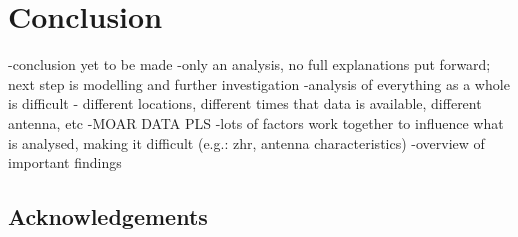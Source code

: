 \chapter{Conclusion}
-conclusion yet to be made
-only an analysis, no full explanations put forward; next step is modelling and further investigation
-analysis of everything as a whole is difficult - different locations, different times that data is available, different antenna, etc
-MOAR DATA PLS
-lots of factors work together to influence what is analysed, making it difficult (e.g.: zhr, antenna characteristics)
-overview of important findings
\section{Acknowledgements}